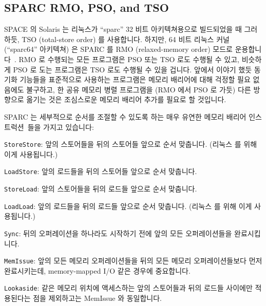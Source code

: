 \subsection{SPARC RMO, PSO, and TSO}

SPACE 의 Solaris 는 리눅스가 ``sparc'' 32 비트 아키텍쳐용으로 빌드되었을 때
그러하듯, TSO (total-store order) 를 사용합니다.
하지만, 64 비트 리눅스 커널 (``sparc64'' 아키텍쳐) 은 SPARC 를 RMO
(relaxed-memory order) 모드로 운용합니다~\cite{SPARC94}.
RMO 로 수행되는 모든 프로그램은 PSO 또는 TSO 로도 수행될 수 있고, 비슷하게 PSO
로 도는 프로그램은 TSO 로도 수행될 수 있을 겁니다.
앞에서 이야기 했듯 동기화 기능들을 표준적으로 사용하는 프로그램은 메모리
배리어에 대해 걱정할 필요 없음에도 불구하고, 한 공유 메모리 병렬 프로그램을
(RMO 에서 PSO 로 가듯) 다른 방향으로 옮기는 것은 조심스로운 메모리 배리어
추가를 필요로 할 것입니다.

SPARC 는 세부적으로 순서를 조절할 수 있도록 하는 매우 유연한 메모리 배리어
인스트럭션~\cite{SPARC94}들을 가지고 있습니다:
\begin{description}
\item	{\tt StoreStore}: 앞의 스토어들을 뒤의 스토어들 앞으로 순서 맞춥니다.
	(리눅스  를 위해 이게 사용됩니다.)
\item	{\tt LoadStore}: 앞의 로드들을 뒤의 스토어들 앞으로 순서 맞춥니다.
\item	{\tt StoreLoad}: 앞의 스토어들을 뒤의 로드들 앞으로 순서 맞춥니다.
\item	{\tt LoadLoad}: 앞의 로드들을 뒤의 로드들 앞으로 순서 맞춥니다.
	(리눅스  를 위해 이게 사용됩니다.)
\item	{\tt Sync}: 뒤의 오퍼레이션을 하나라도 시작하기 전에 앞의 모든
	오퍼레이션들을 완료시킵니다.
\item	{\tt MemIssue}: 앞의 모든 메모리 오퍼레이션들을 뒤의 모든 메모리
	오퍼레이션들보다 먼저 완료시키는데, memory-mapped I/O 같은 경우에
	중요합니다.
\item	{\tt Lookaside}: 같은 메모리 위치에 액세스하는 앞의 스토어들과 뒤의
	로드들 사이에만 적용된다는 점을 제외하고는 MemIssue 와 동일합니다.
\end{description}
\iffalse

